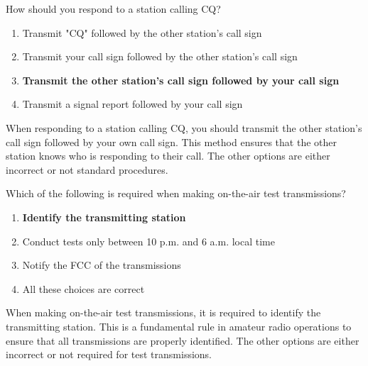\begin{tcolorbox}[colback=gray!10!white,colframe=black!75!black,title={T2A05}]
How should you respond to a station calling CQ?
\begin{enumerate}[label=\Alph*),noitemsep]
    \item Transmit "CQ" followed by the other station’s call sign
    \item Transmit your call sign followed by the other station’s call sign
    \item \textbf{Transmit the other station’s call sign followed by your call sign}
    \item Transmit a signal report followed by your call sign
\end{enumerate}
\end{tcolorbox}
When responding to a station calling CQ, you should transmit the other station’s call sign followed by your own call sign. This method ensures that the other station knows who is responding to their call. The other options are either incorrect or not standard procedures.

\begin{tcolorbox}[colback=gray!10!white,colframe=black!75!black,title={T2A06}]
Which of the following is required when making on-the-air test transmissions?
\begin{enumerate}[label=\Alph*),noitemsep]
    \item \textbf{Identify the transmitting station}
    \item Conduct tests only between 10 p.m. and 6 a.m. local time
    \item Notify the FCC of the transmissions
    \item All these choices are correct
\end{enumerate}
\end{tcolorbox}
When making on-the-air test transmissions, it is required to identify the transmitting station. This is a fundamental rule in amateur radio operations to ensure that all transmissions are properly identified. The other options are either incorrect or not required for test transmissions.

